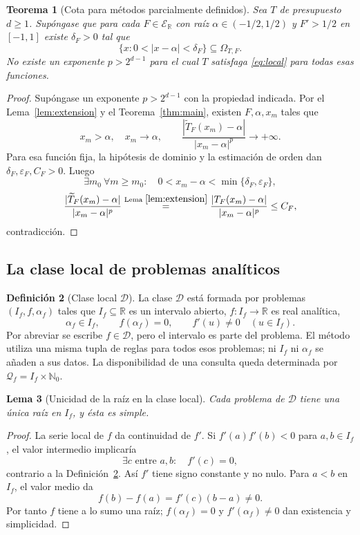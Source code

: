 \documentclass[11pt,a4paper]{article}
\numberwithin{equation}{section}
\newtheorem{theorem}{Teorema}[section]
\newtheorem{lemma}[theorem]{Lema}
\theoremstyle{definition}
\newtheorem{definition}[theorem]{Definición}
\theoremstyle{remark}
\newcommand{\R}{\mathbb R}
\newcommand{\Nn}{\mathbb N_0}
\newcommand{\ER}{\mathcal E_{\R}}
\newcommand{\QQ}{\mathcal Q}
\newcommand{\DD}{\mathcal D}
\begin{document}
\begin{theorem}[Cota para métodos parcialmente definidos]\label{thm:partial}
Sea $T$ de presupuesto $d\ge1$. Supóngase que para cada $F\in\ER$ con raíz $\alpha\in(-1/2,1/2)$ y $F'>1/2$ en $[-1,1]$ existe $\delta_F>0$ tal que
\[
\{x:0<|x-\alpha|<\delta_F\}\subseteq\Omega_{T,F}.
\]
No existe un exponente $p>2^{d-1}$ para el cual $T$ satisfaga \eqref{eq:local} para todas esas funciones.
\end{theorem}
\begin{proof}
Supóngase un exponente $p>2^{d-1}$ con la propiedad indicada. Por el Lema~\ref{lem:extension} y el Teorema~\ref{thm:main}, existen $F,\alpha,x_m$ tales que
\[
x_m>\alpha,\quad x_m\to\alpha,\qquad
\frac{|\widetilde T_F(x_m)-\alpha|}{|x_m-\alpha|^p}\to+\infty.
\]
Para esa función fija, la hipótesis de dominio y la estimación de orden dan $\delta_F,\varepsilon_F,C_F>0$. Luego
\[
\exists m_0\ \forall m\ge m_0:\quad
0<x_m-\alpha<\min\{\delta_F,\varepsilon_F\},
\]
\[
\frac{|\widetilde T_F(x_m)-\alpha|}{|x_m-\alpha|^p}
\overset{\text{Lema }\ref{lem:extension}}=
\frac{|T_F(x_m)-\alpha|}{|x_m-\alpha|^p}\le C_F,
\]
contradicción.
\end{proof}

\subsection{La clase local de problemas analíticos}
\begin{definition}[Clase local $\DD$]\label{def:localclass}
La clase $\DD$ está formada por problemas $(I_f,f,\alpha_f)$ tales que $I_f\subseteq\R$ es un intervalo abierto, $f:I_f\to\R$ es real analítica,
\[
\alpha_f\in I_f,\qquad f(\alpha_f)=0,\qquad
f'(u)\ne0\quad(u\in I_f).
\]
Por abreviar se escribe $f\in\DD$, pero el intervalo es parte del problema. El método utiliza una misma tupla de reglas para todos esos problemas; ni $I_f$ ni $\alpha_f$ se añaden a sus datos. La disponibilidad de una consulta queda determinada por $\QQ_f=I_f\times\Nn$.
\end{definition}

\begin{lemma}[Unicidad de la raíz en la clase local]\label{lem:localunique}
Cada problema de $\DD$ tiene una única raíz en $I_f$, y ésta es simple.
\end{lemma}
\begin{proof}
La serie local de $f$ da continuidad de $f'$. Si $f'(a)f'(b)<0$ para $a,b\in I_f$, el valor intermedio implicaría
\[
\exists c\text{ entre }a,b:\quad f'(c)=0,
\]
contrario a la Definición~\ref{def:localclass}. Así $f'$ tiene signo constante y no nulo. Para $a<b$ en $I_f$, el valor medio da
\[
f(b)-f(a)=f'(c)(b-a)\ne0.
\]
Por tanto $f$ tiene a lo sumo una raíz; $f(\alpha_f)=0$ y $f'(\alpha_f)\ne0$ dan existencia y simplicidad.
\end{proof}
\end{document}
